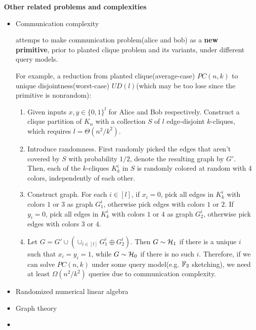 \textbf{Other related problems and complexities}
\begin{itemize}
    \item Communication complexity
    

    \cite{rashtchian2021averagecase} attemps to make communication problem(alice and bob) as a \textbf{new primitive}, prior to planted clique problem and its variants, under different query models. 
    
    For example, a reduction from planted clique(average-case) $PC(n,k)$ to unique disjointness(worst-case) $UD(l)$(which may be too lose since the primitive is nonrandom):
    \begin{enumerate}
        \item Given inputs $x,y\in\{0,1\}^l$ for Alice and Bob respectively.  Construct a clique partition of $K_n$ with a collection $S$ of $l$ edge-disjoint $k$-cliques, which requires $l=\Theta(n^2/k^2)$.
        \item Introduce randomness. First randomly picked the edges that aren't covered by $S$ with probability $1/2$, denote the resulting graph by $G'$. Then, each of the $k$-cliques $K_k^i$ in $S$  is randomly colored at random with 4 colors, independently of each other.
        \item Construct graph. For each $i\in[l]$, if $x_i=0$, pick all edges in $K_k^i$ with colors $1$ or $3$ as graph $G_1^i$, otherwise pick edges with colors $1$ or $2$.
        If $y_i=0$, pick all edges in $K_k^i$ with colors $1$ or $4$ as graph $G_2^i$, otherwise pick edges with colors $3$ or $4$.

        \item Let $G=G'\cup(\cup_{i\in[l]}G_1^i\oplus G_2^i)$. Then $G\sim\mathcal{H}_1$ if there is a unique $i$ such that $x_i=y_i=1$, while $G\sim\mathcal{H}_0$ if there is no such $i$. Therefore, if we can solve $PC(n,k)$ under some query model(e.g. $\mathbb{F}_2$ sketching), we need at least $\Omega(n^2/k^2)$ queries due to communication complexity.
    \end{enumerate}

    \item Randomized numerical linear algebra
    
    
    \item Graph theory
    

    \item 
\end{itemize}

